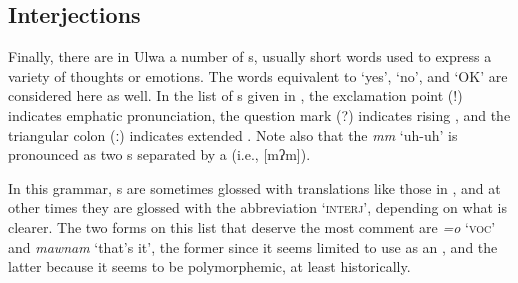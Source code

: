 \subsection{Interjections}\label{sec:8.3.3}


Finally, there are in Ulwa a number of s, usually short words used to express a variety of thoughts or emotions. The words equivalent to ‘yes’, ‘no’, and ‘OK’ are considered here as well. In the list of s given in , the exclamation point (!) indicates emphatic pronunciation, the question mark (?) indicates rising , and the triangular colon (ː) indicates extended   . Note also that the  \textit{mm} ‘uh-uh’ is pronounced as two s separated by a    (i.e., [mʔm]).

In this grammar, s are sometimes glossed with translations like those in , and at other times they are glossed with the abbreviation ‘\textsc{interj}’, depending on what is clearer. The two forms on this list that deserve the most comment are \textit{=o} ‘\textsc{voc}’ and \textit{mawnam} ‘that’s it’, the former since it seems limited to use as an , and the latter because it seems to be polymorphemic, at least historically.

\newpage

